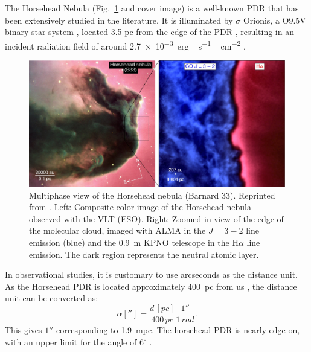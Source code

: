 \documentclass[12pt,a4paper]{article}
\begin{document}

The Horsehead Nebula (Fig.~\ref{fig:obsimg} and cover image) is a well-known PDR that has been extensively studied in the literature. It is illuminated by $\sigma$ Orionis, a O9.5V binary star system \parencite{Warren1977}, located 3.5 pc from the edge of the PDR \parencite{Abergel2003,Schirmer2020}, resulting in an incident radiation field of around \qty{2.7e-3}{erg\,\second^{-1}\,\centi\metre^{-2}} \parencite{Habart2005}. 

\begin{figure}[ht]
    \centering
    \includegraphics[width=\textwidth,keepaspectratio]{horsehead_HernandezVera2023.pdf}
    \caption{Multiphase view of the Horsehead nebula (Barnard 33). Reprinted from \textcite{HernándezVera2023}. Left: Composite color image of the Horsehead nebula observed with the VLT (ESO). Right: Zoomed-in view of the edge of the molecular cloud, imaged with ALMA in the  $J = 3-2$ line emission (blue) and the \qty{0.9}{m} KPNO telescope in the H$\alpha$ line emission. The dark region represents the neutral atomic layer.} \label{fig:obsimg}
\end{figure}

In observational studies, it is customary to use arcseconds as the distance unit. As the Horsehead PDR is located approximately \qty{400}{pc} from us \parencite{Menten2007, Schlafly2014}, the distance unit can be converted as:
\begin{equation}
    \alpha[''] = \frac{d\,[\unit{pc}]}{400\,\unit{pc}} \frac{1''}{1\,\unit{rad}}.
\end{equation}
This gives \(1''\) corresponding to \qty{1.9}{mpc}. The horsehead PDR is nearly edge-on, with an upper limit for the angle of $6^\circ$ \parencite{Habart2005}.
\end{document}
